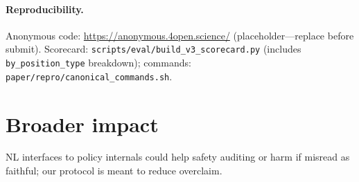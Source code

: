 \documentclass[10pt]{article}
\newcommand{\code}[1]{\texttt{\small #1}}
\begin{document}
\paragraph{Reproducibility.}
Anonymous code: \url{https://anonymous.4open.science/} (placeholder---replace
before submit).
Scorecard: \code{scripts/eval/build\_v3\_scorecard.py} (includes
\code{by\_position\_type} breakdown);
commands: \code{paper/repro/canonical\_commands.sh}.

\section*{Broader impact}
NL interfaces to policy internals could help safety auditing or harm if
misread as faithful; our protocol is meant to reduce overclaim.



\end{document}
